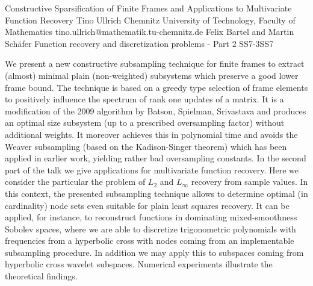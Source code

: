 \begin{talk}
{Constructive Sparsification of Finite Frames and Applications to Multivariate Function Recovery}
{Tino Ullrich}
{Chemnitz University of Technology, Faculty of Mathematics}
{tino.ullrich@mathematik.tu-chemnitz.de}
{Felix Bartel and Martin Sch\"afer}
{Function recovery and discretization problems - Part 2}
{}{SS7-3}{SS7}

 

We present a new constructive subsampling technique for finite frames to extract (almost) minimal plain (non-weighted) subsystems which preserve a good lower frame bound. The technique is based on a greedy type selection of frame elements to positively influence the spectrum of rank one updates of a matrix. It is a modification of the 2009 algorithm by Batson, Spielman, Srivastava and produces an optimal size subsystem (up to a prescribed oversampling factor) without additional weights. It moreover achieves this in polynomial time and avoids the Weaver subsampling (based on the Kadison-Singer theorem) which has been applied in earlier work, yielding rather bad oversampling constants. In the second part of the talk we give applications for multivariate function recovery. Here we consider the particular the problem of $L_2$ and $L_\infty$ recovery from sample values. In this context, the presented subsampling technique allows to determine optimal (in cardinality) node sets even suitable for plain least squares recovery. It can be applied, for instance, to reconstruct functions in dominating mixed-smoothness Sobolev spaces, where we are able to discretize trigonometric polynomials with frequencies from a hyperbolic cross with nodes coming from an implementable subsampling procedure. In addition we may apply this to subspaces coming from hyperbolic cross wavelet subspaces. Numerical experiments illustrate the theoretical findings. 
\end{talk}

